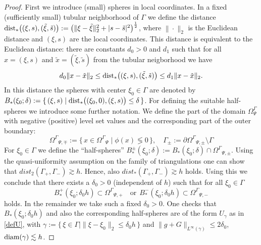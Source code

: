 \documentclass[final]{siamltex}
\begin{document}
\begin{proof}
First we introduce (small) spheres in local coordinates. In a fixed (sufficiently small) tubular neighborhood of $\Gamma$ we define the distance ${\rm dist}_\ast\big((\xi,s),(\tilde \xi,\tilde s)\big):= \big( \|\xi - \tilde \xi\|_2^2 + |s-\tilde s|^2\big)^\frac12$, where $\|\cdot\|_2$ is the Euclidean distance and $(\xi,s)$ are the local coordinates.
This distance is equivalent to the Euclidean distance: there are constants $d_0 >0$ and $d_1$ such that for all $x=(\xi,s)$ and $\tilde x=(\tilde \xi, \tilde s)$ from the tubular neigborhood we have 
\begin{equation} \label{normeq}
 d_0 \|x- \tilde x\|_2 \leq {\rm dist}_\ast\big((\xi,s),(\tilde \xi,\tilde s)\big) \leq d_1 \|x- \tilde x\|_2 .
\end{equation}
In this distance the spheres with center $\xi_0 \in \Gamma$ are denoted by $B_\ast(\xi_0;\delta):= \{\, (\xi,s)\mid {\rm dist}_\ast \big((\xi_0,0),(\xi,s) \big) \leq \delta\,\}$. For defining the suitable half-spheres we introduce some further notation. We define the part of the domain $\Omega^\Gamma_\Psi$ with negative (positive) level set values and the corresponding part of the outer boundary:
\begin{equation*}
  {\Omega^{\Gamma}}_{\Psi,\mp} := \{\, x \in {\Omega^{\Gamma}}_\Psi \mid \phi(x) \lessgtr 0\,\}, \quad 
 \Gamma_{\pm} := \partial{\Omega^{\Gamma}}_{\Psi,\pm} \setminus \Gamma
\end{equation*}
 For $\xi_0 \in \Gamma$ we define the ``half-spheres''
 $B_\ast^{\pm}(\xi_0;\delta):=B_\ast(\xi_0;\delta)\cap {\Omega^{\Gamma}}_{\Psi,\pm}$.
 Using the quasi-uniformity assumption on the family of triangulations one can show 
 that $dist_2(\Gamma_+,\Gamma_-) \gtrsim h$. Hence, also
 $dist_\ast(\Gamma_+,\Gamma_-) \gtrsim h$ holds.
 Using this we conclude that there exists a $\delta_0 >0$ (independent of $h$) such that for all $\xi_0 \in \Gamma$
 \begin{equation} \label{either}
  B_\ast^+(\xi_0;\delta_0 h) \subset {\Omega^{\Gamma}}_{\Psi,+} \quad \text{or}~~ B_\ast^-(\xi_0;\delta_0 h) \subset {\Omega^{\Gamma}}_{\Psi,-}
 \end{equation}
 holds. In the remainder we take such a fixed $\delta_0 > 0$. One checks that $B_\ast(\xi_0;\delta_0 h)$ and also the corresponding half-spheres are of the form $U_\gamma$ as in \eqref{defU}, with $\gamma:=\{\, \xi \in \Gamma \mid \|\xi- \xi_0\|_2 \leq \delta_0 h \,\}$ and $\|g+G\|_{L^\infty(\gamma)} \leq 2 \delta_0$, ${\rm diam (\gamma)} \lesssim h$. 


\end{proof}
\end{document}
